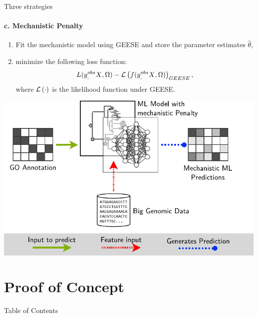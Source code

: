 \documentclass[10pt,aspectratio=169]{beamer}
\newcounter{frame}[frame]
\newcommand{\toc}[0]{\begin{frame}{Table of Contents}
    \tableofcontents[current]
\end{frame}}
\begin{document}
\begin{frame}{Three strategies}
	\framesubtitle{c. Mechanistic Penalty}
	\begin{minipage}[b]{.4\linewidth}
		\begin{enumerate}[<+->]
		\item Fit the mechanistic model using GEESE and store the parameter estimates $\hat\theta$, 
		\item minimize the following loss function: 
		$$
		L(y_{,}^{obs} X{}, \Omega) - \mathcal{L}\left(f(y_{,}^{obs} X{}, \Omega)\right)_{GEESE},$$
		\noindent where $\mathcal{L}\left(\cdot\right)$ is the likelihood function under GEESE.
		\end{enumerate}
	\end{minipage}\hfill%
	\begin{minipage}[b]{.55\linewidth}
		\includegraphics[width=1\linewidth]{fig/mech-ml-model-c.pdf}
	\end{minipage}
\end{frame}

\section{Proof of Concept}\toc{}
\end{document}
